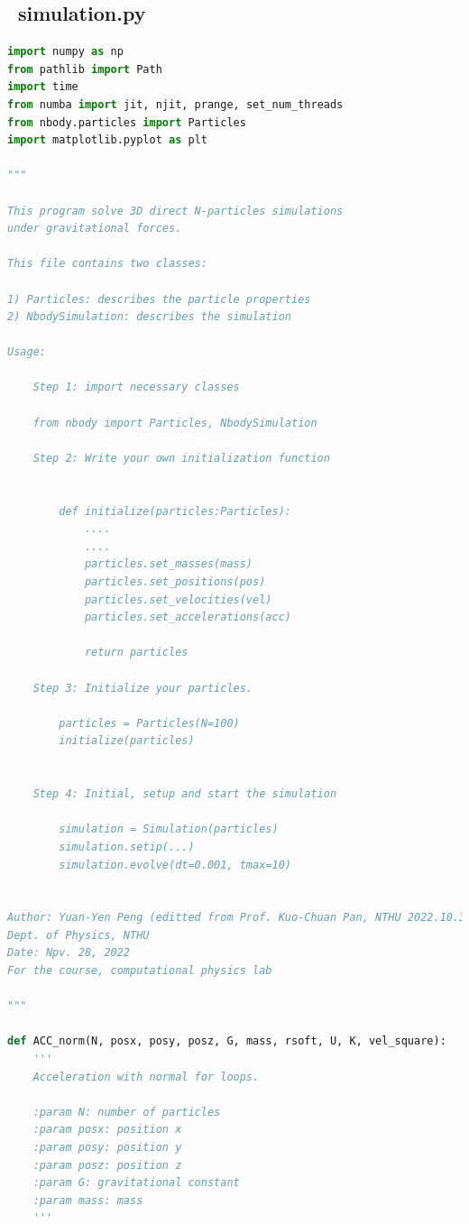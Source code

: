 \documentclass[12pt]{article}
\begin{document}
    \subsection{{\ttfamily\ simulation.py}}
      \begin{lstlisting}[language={Python}]
import numpy as np
from pathlib import Path
import time
from numba import jit, njit, prange, set_num_threads
from nbody.particles import Particles 
import matplotlib.pyplot as plt

"""

This program solve 3D direct N-particles simulations 
under gravitational forces. 

This file contains two classes:

1) Particles: describes the particle properties
2) NbodySimulation: describes the simulation

Usage:

    Step 1: import necessary classes

    from nbody import Particles, NbodySimulation

    Step 2: Write your own initialization function

    
        def initialize(particles:Particles):
            ....
            ....
            particles.set_masses(mass)
            particles.set_positions(pos)
            particles.set_velocities(vel)
            particles.set_accelerations(acc)

            return particles

    Step 3: Initialize your particles.

        particles = Particles(N=100)
        initialize(particles)


    Step 4: Initial, setup and start the simulation

        simulation = Simulation(particles)
        simulation.setip(...)
        simulation.evolve(dt=0.001, tmax=10)


Author: Yuan-Yen Peng (editted from Prof. Kuo-Chuan Pan, NTHU 2022.10.30)
Dept. of Physics, NTHU
Date: Npv. 28, 2022
For the course, computational physics lab

"""

def ACC_norm(N, posx, posy, posz, G, mass, rsoft, U, K, vel_square):
    '''
    Acceleration with normal for loops.
    
    :param N: number of particles
    :param posx: position x
    :param posy: position y
    :param posz: position z
    :param G: gravitational constant
    :param mass: mass
    '''
    

\end{lstlisting}
\end{document}
